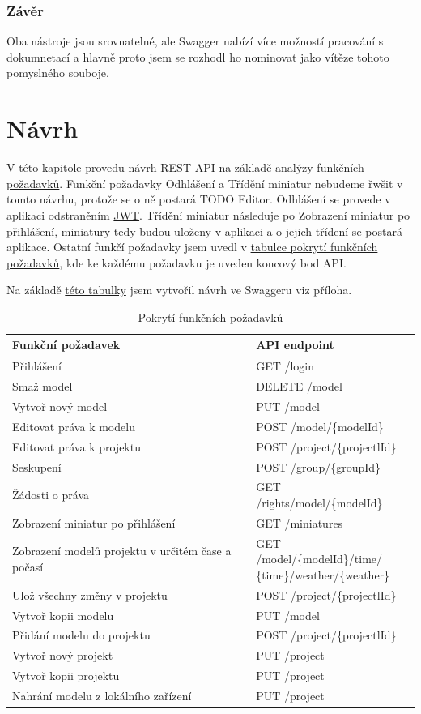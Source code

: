 \documentclass[thesis=B,czech]{FITthesis}[2012/06/26]
\begin{document}
        \subsection{Závěr}
            Oba nástroje jsou srovnatelné, ale Swagger nabízí více možností pracování s dokumnetací a hlavně proto jsem se rozhodl ho nominovat jako vítěze tohoto pomyslného souboje.

\chapter{Návrh}
    V této kapitole provedu návrh REST API na základě \hyperref[sec:analFP]{analýzy funkčních požadavků}. Funkční požadavky Odhlášení a Třídění miniatur nebudeme řwšit v tomto návrhu, protože se o ně postará TODO Editor. Odhlášení se provede v aplikaci odstraněním \hyperref[sec:jwt]{JWT}. Třídění miniatur následuje po Zobrazení miniatur po přihlášení, miniatury tedy budou uloženy v aplikaci a o jejich třídení se postará aplikace. Ostatní funkčí požadavky jsem uvedl v \hyperref[sec:tabulkaPokryti]{tabulce pokrytí funkčních požadavků}, kde ke každému požadavku je uveden koncový bod API.
    
    Na základě \hyperref[sec:tabulkaPokryti]{této tabulky} jsem vytvořil návrh ve Swaggeru viz příloha.
    
    \begin{table}\centering
    	\caption{Pokrytí funkčních požadavků} \label{tabulkaPokryti}
    	\begin{tabular}{| p{6cm} | p{5cm} |}\hline
    		Funkční požadavek		& API endpoint	\tabularnewline \hline \hline
            Přihlášení & GET /login
        	\tabularnewline \hline
            Smaž model &	DELETE /model
        	\tabularnewline \hline
            Vytvoř nový model &	PUT /model
        	\tabularnewline \hline
            Editovat práva k modelu &	POST /model/\{modelId\}
        	\tabularnewline \hline
            Editovat práva k projektu &	POST /project/\{projectlId\}
        	\tabularnewline \hline
            Seskupení & POST /group/\{groupId\}
        	\tabularnewline \hline
            Žádosti o práva & GET /rights/model/\{modelId\}
        	\tabularnewline \hline
            Zobrazení miniatur po přihlášení & GET /miniatures
        	\tabularnewline \hline
            Zobrazení modelů projektu v určitém čase a počasí &
            \parbox[t]{5cm}{GET /model/\{modelId\}/time/\\\{time\}/weather/\{weather\}}
        	\tabularnewline \hline
            Ulož všechny změny v projektu &	POST /project/\{projectlId\}
        	\tabularnewline \hline
            Vytvoř kopii modelu	& PUT /model
        	\tabularnewline \hline
            Přidání modelu do projektu & POST /project/\{projectlId\}
        	\tabularnewline \hline
            Vytvoř nový projekt & PUT /project
        	\tabularnewline \hline
            Vytvoř kopii projektu &	PUT /project
        	\tabularnewline \hline
            Nahrání modelu z lokálního zařízení & PUT /project
        	\tabularnewline \hline
        \end{tabular}
    \end{table}
\end{document}
